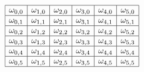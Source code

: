 \documentclass[preview]{standalone}
\begin{document}
\Huge
$$\begin{array}{|c|c|c|c|c|c|}
\hline
\omega_{0,0}	&	\omega_{1,0}	& \omega_{2,0}	&	\omega_{3,0}	&	\omega_{4,0}	&	\omega_{5,0}\\
\hline
\omega_{0,1}	&	\omega_{1,1}	& \omega_{2,1}	&	\omega_{3,1}	&	\omega_{4,1}	&	\omega_{5,1}\\
\hline
\omega_{0,2}	&	\omega_{1,2}	& \omega_{2,2}	&	\omega_{3,2}	&	\omega_{4,2}	&	\omega_{5,2}\\
\hline
\omega_{0,3}	&	\omega_{1,3}	& \omega_{2,3}	&	\omega_{3,3}	&	\omega_{4,3}	&	\omega_{5,3}\\
\hline
\omega_{0,4}	&	\omega_{1,4}	& \omega_{2,4}	&	\omega_{3,4}	&	\omega_{4,4}	&	\omega_{5,4}\\
\hline
\omega_{0,5}	&	\omega_{1,5}	& \omega_{2,5}	&	\omega_{3,5}	&	\omega_{4,5}	&	\omega_{5,5}\\
\hline
\end{array}$$
\end{document}
